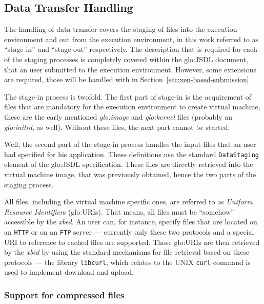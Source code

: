 \subsection{Data Transfer Handling}
\label{sec:xbed:data-transfer}

The  handling  of data  transfer  covers the  staging  of  files into  the
execution environment and out from the execution environment, in this work
referred   to  as  ``stage-in''   and  ``stage-out''   respectively.   The
description  that  is  required  for  each of  the  staging  processes  is
completely  covered  within  the  \gls{glo:JSDL} document,  that  an  user
submitted  to the  execution  environment.  However,  some extensions  are
required,       those       will       be      handled       with       in
Section~\ref{sec:xen-based-submission}.

The  stage-in process  is  twofold.  The  first  part of  stage-in is  the
acquirement of files  that are mandatory for the  execution environment to
create    virtual    machine,    these    are    the    early    mentioned
\emph{\gls{glo:image}}  and  \emph{\gls{glo:kernel}}  files  (probably  an
\emph{\gls{glo:initrd}},  as well).   Without these  files, the  next part
cannot be started.

Well, the second part of the stage-in process handles the input files that
an  user had  specified for  his  application. These  definitions use  the
standard    \texttt{DataStaging}    element    of    the    \gls{glo:JSDL}
specification. These files are directly retrieved into the virtual machine
image, that  was previously obtained, hence  the two parts  of the staging
process.

All files, including the virtual machine specific ones, are referred to as
\emph{Uniform  Resource  Identifier}s  (\gls{glo:URI}s). That  means,  all
files must be ``somehow'' accessible by the \emph{xbed}.  An user can, for
instance,  specify files that  are located  on an  \texttt{HTTP} or  on an
\texttt{FTP} server ---  currently only these two protocols  and a special
URI to reference to cached  files are supported.  Those \gls{glo:URI}s are
then retrieved  by the  \emph{xbed} by using  the standard  mechanisms for
file retrieval based on  these protocols --- the library \texttt{libcurl},
which  relates to  the UNIX  \texttt{curl}  command is  used to  implement
download and upload.

\subsubsection{Support for compressed files}

